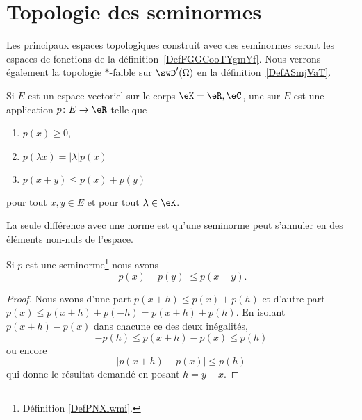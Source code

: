 \section{Topologie des seminormes}

Les principaux espaces topologiques construit avec des seminormes seront les espaces de fonctions de la définition~\ref{DefFGGCooTYgmYf}. Nous verrons également la topologie \( *\)-faible sur \( \swD'(\Omega)\) en la définition~\ref{DefASmjVaT}.

\begin{definition}  \label{DefPNXlwmi}
	Si \( E\) est un espace vectoriel sur le corps \( \eK=\eR,\eC\), une  sur \( E\) est une application \( p\colon E\to \eR\) telle que
	\begin{enumerate}
		\item
		      \( p(x)\geq 0\),
		\item   \label{ItemSHnimhDii}
		      \( p(\lambda x)=| \lambda |p(x)\)
		\item   \label{ItemSHnimhDiii}
		      \( p(x+y)\leq p(x)+p(y)\)
	\end{enumerate}
	pour tout \( x,y\in E\) et pour tout \( \lambda\in \eK\).
\end{definition}

La seule différence avec une norme est qu'une seminorme peut s'annuler en des éléments non-nuls de l'espace.

\begin{lemma}
	Si \( p\) est une seminorme\footnote{Définition \ref{DefPNXlwmi}.} nous avons
	\begin{equation}
		| p(x)-p(y) |\leq p(x-y).
	\end{equation}
\end{lemma}

\begin{proof}
	Nous avons d'une part \( p(x+h)\leq p(x)+p(h)\) et d'autre part \( p(x)\leq p(x+h)+p(-h)=p(x+h)+p(h)\). En isolant \( p(x+h)-p(x)\) dans chacune ce des deux inégalités,
	\begin{equation}
		-p(h)\leq p(x+h)-p(x)\leq p(h)
	\end{equation}
	ou encore
	\begin{equation}
		|p(x+h)-p(x)|\leq p(h)
	\end{equation}
	qui donne le résultat demandé en posant \( h=y-x\).
\end{proof}

